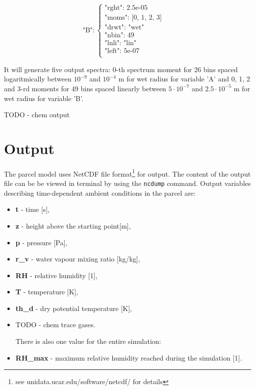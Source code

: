 \documentclass[11pt]{article}
\newcommand{\prog}[1]{{\tt#1}}
\begin{document}
\begin{itemize}
$$
\mbox{"B"}: \left\{ \begin{array}{ll}
\mbox{"rght": 2.5e-05} & \textrm{}\\
\mbox{"moms": [0, 1, 2, 3] } & \textrm{}\\
\mbox{"drwt": "wet"} & \textrm{}\\
\mbox{"nbin": 49} & \textrm{}\\
\mbox{"lnli": "lin"} & \textrm{}\\
\mbox{"left": 5e-07} & \textrm{}\\
\end{array} \right.
$$
 
\vspace{0.35cm}
   It will generate five output spectra:
      0-th spectrum moment for 26 bins spaced logaritmically between $10^{-9}$ and $10^{-4}$ m for wet radius for variable 'A' and 
      0, 1, 2 and 3-rd moments for 49 bins spaced linearly between $5\cdot10^{-7}$ and $2.5\cdot10^{-5}$ m for wet radius for variable 'B'.

    TODO - chem output

\end{itemize}

\section{Output}

The parcel model uses NetCDF file format\footnote{see unidata.ucar.edu/software/netcdf/ for details} for output.
The content of the output file can be be viewed in terminal by using the \prog{ncdump} command.
Output variables describing time-dependent ambient conditions in the parcel are:

\begin{itemize}
  \item \textbf{t} - time [s],
  \item \textbf{z} - height above the starting point[m],
  \item \textbf{p} - pressure [Pa],
  \item \textbf{r\_v} - water vapour mixing ratio [kg/kg],
  \item \textbf{RH} - relative humidity [1],
  \item \textbf{T} - temperature [K],
  \item \textbf{th\_d} - dry potential temperature [K],
  \item TODO - chem trace gases.

There is also one value for the entire simulation:

\item \textbf{RH\_{max}} - maximum relative humidity reached during the simulation [1].

\end{itemize}
\end{document}
